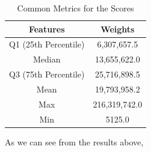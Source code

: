 \documentclass[a4paper,12pt,twocolumn]{article}
\begin{document}
\begin{table}[h]
    \centering
	\begin{tabular}{|c|c|}
		\hline
		\textbf{Features}   & \textbf{Weights}     \\
		\hline
		Q1 (25th Percentile)  & 6,307,657.5 \\
		\hline
		Median         & 13,655,622.0  \\
		\hline
		Q3 (75th Percentile)      & 25,716,898.5 \\
		\hline
		Mean & 19,793,958.2 \\
		\hline
		Max     & 216,319,742.0  \\
		\hline
		Min          & 5125.0 \\
		\hline
	\end{tabular}
	\caption{Common Metrics for the Scores}
	\label{metric_scores}
\end{table}

As we can see from the results above, 
\end{document}
